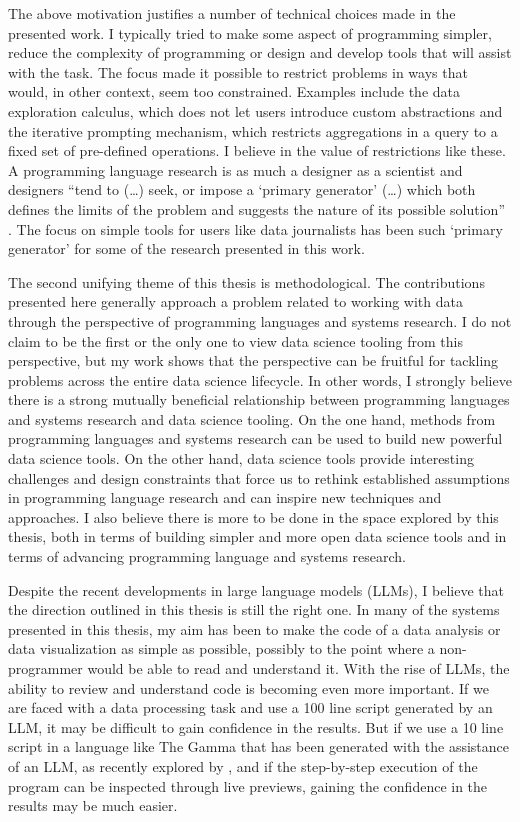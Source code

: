\documentclass[fleqn,11pt]{report}
\theoremstyle{definition}
\begin{document}
The above motivation justifies a number of technical choices made in the presented work.
I typically tried to make some aspect of programming simpler, reduce the complexity of
programming or design and develop tools that will assist with the task. The focus made
it possible to restrict problems in ways that would, in other context, seem too constrained.
Examples include the data exploration calculus, which does not let users introduce custom
abstractions and the iterative prompting mechanism, which restricts aggregations in a query
to a fixed set of pre-defined operations. I believe in the value of restrictions
like these. A programming language research is as much a designer as a scientist and
designers ``tend to (\ldots) seek, or impose a `primary generator' (\dots) which both
defines the limits of the problem and suggests the nature of its possible solution''
\citep{cross-2007-designerly}. The focus on simple tools for users like data journalists
has been such `primary generator' for some of the research presented in this work.

The second unifying theme of this thesis is methodological. The contributions presented here
generally approach a problem related to working with data through the perspective
of programming languages and systems research. I do not claim to be the first or the only one
to view data science tooling from this perspective, but my work shows that the perspective can
be fruitful for tackling problems across the entire data science lifecycle. In other words,
I strongly believe there is a strong mutually beneficial relationship between programming
languages and systems research and data science tooling. On the one hand, methods from
programming languages and systems research can be used to build new powerful data science tools.
On the other hand, data science tools provide interesting challenges and design constraints that
force us to rethink established assumptions in programming language research and can inspire new
techniques and approaches.
%
I also believe there is more to be done in the space explored by this thesis, both in terms
of building simpler and more open data science tools and in terms of advancing programming
language and systems research.

Despite the recent developments in large language models (LLMs), I believe that the
direction outlined in this thesis is still the right one. In many of the systems presented
in this thesis, my aim has been to make the code of a data analysis or data visualization
as simple as possible, possibly to the point where a non-programmer would be able to read
and understand it. With the rise of LLMs, the ability to review and understand code is
becoming even more important. If we are faced with a data processing task and use a 100 line
script generated by an LLM, it may be difficult to gain confidence in the results. But if
we use a 10 line script in a language like The Gamma that has been generated with the assistance
of an LLM, as recently explored by \cite{fromm-2024-llm}, and if the step-by-step execution
of the program can be inspected through live previews, gaining the confidence in the results may be much easier.
\end{document}
